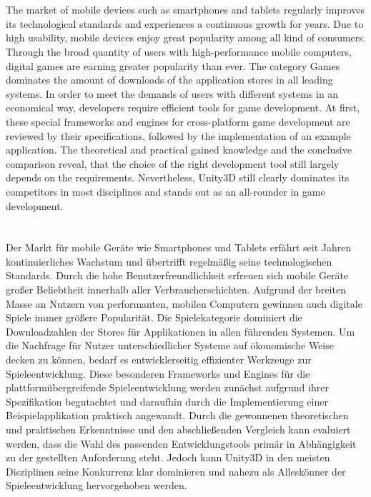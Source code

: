 \section*{\centering\abstractname}
The market of mobile devices such as smartphones and tablets regularly improves its technological standards and experiences a continuous growth for years. Due to high usability, mobile devices enjoy great popularity among all kind of consumers. Through the broad quantity of users with high-performance mobile computers, digital games are earning greater popularity than ever. The category Games dominates the amount of downloads of the application stores in all leading systems. In order to meet the demands of users with different systems in an economical way, developers require efficient tools for game development. At first, these special frameworks and engines for cross-platform game development are reviewed by their specifications, followed by the implementation of an example application. The theoretical and practical gained knowledge and the conclusive comparison reveal, that the choice of the right development tool still largely depends on the requirements. Nevertheless, Unity3D still clearly dominates its competitors in most disciplines and stands out as an all-rounder in game development. 


\section*{\centering\abstractname}
Der Markt für mobile Geräte wie Smartphones und Tablets erfährt seit Jahren kontinuierliches Wachstum und übertrifft regelmäßig seine technologischen Standards. Durch die hohe Benutzerfreundlichkeit erfreuen sich mobile Geräte großer Beliebtheit innerhalb aller Verbraucherschichten. Aufgrund der breiten Masse an Nutzern von performanten, mobilen Computern gewinnen auch digitale Spiele immer größere Popularität. Die Spielekategorie dominiert die Downloadzahlen der Stores für Applikationen in allen führenden Systemen. Um die Nachfrage für Nutzer unterschiedlicher Systeme auf ökonomische Weise decken zu können, bedarf es entwicklerseitig effizienter Werkzeuge zur Spieleentwicklung.
Diese besonderen Frameworks und Engines für die plattformübergreifende Spieleentwicklung werden zunächst aufgrund ihrer Spezifikation begutachtet und daraufhin durch die Implementierung einer Beispielapplikation praktisch angewandt. Durch die gewonnenen theoretischen und praktischen Erkenntnisse und den abschließenden Vergleich kann evaluiert werden, dass die Wahl des passenden Entwicklungstools primär in Abhängigkeit zu der gestellten Anforderung steht. Jedoch kann Unity3D in den meisten Disziplinen seine Konkurrenz klar dominieren und nahezu als Alleskönner der Spieleentwicklung hervorgehoben werden.


